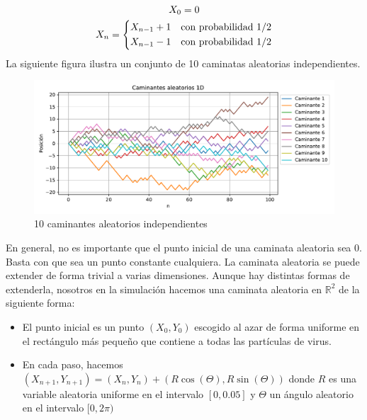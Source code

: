 \documentclass[11pt]{article}
\begin{document}
\begin{equation}
    \begin{gathered}
        X_0 = 0 \\
        X_n = \begin{dcases}
            X_{n-1}+1 & \text{con probabilidad } 1/2 \\
            X_{n-1}-1 & \text{con probabilidad } 1/2 \\
        \end{dcases}
    \end{gathered}
\end{equation}
La siguiente figura ilustra un conjunto de 10 caminatas aleatorias independientes.
\begin{figure}[h]
    \centering
    \includegraphics[width=\textwidth]{caminantes.pdf}
    \caption{10 caminantes aleatorios independientes}
\end{figure}
En general, no es importante que el punto inicial de una caminata aleatoria sea 0. Basta con que sea un punto constante cualquiera. La caminata aleatoria se puede extender de forma trivial a varias dimensiones. Aunque hay distintas formas de extenderla, nosotros en la simulación hacemos una caminata aleatoria en $\mathbb{R}^2$ de la siguiente forma: 
\begin{itemize}
    \item El punto inicial es un punto $(X_0,Y_0)$ escogido al azar de forma uniforme en el rectángulo más pequeño que contiene a todas las partículas de virus.
    \item En cada paso, hacemos $(X_{n+1},Y_{n+1}) = (X_n,Y_n) + (R\cos(\Theta),R\sin(\Theta))$ donde $R$ es una variable aleatoria uniforme en el intervalo $[0,0.05]$ y $\Theta$ un ángulo aleatorio en el intervalo $[0,2\pi)$
\end{itemize}
\end{document}
